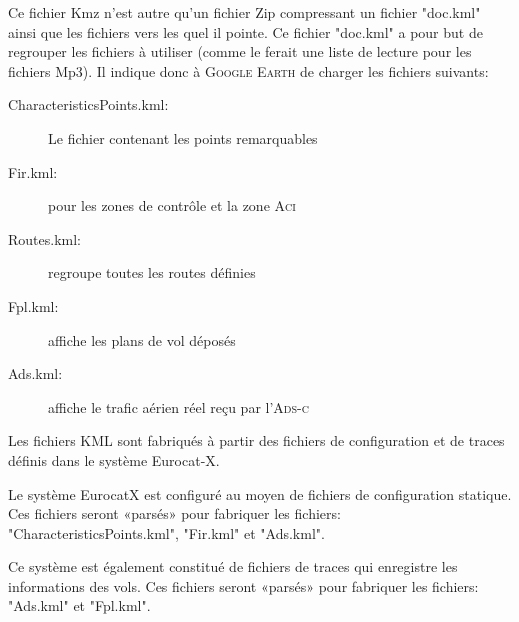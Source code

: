 Ce fichier Kmz n'est autre qu'un fichier Zip compressant un fichier "doc.kml" ainsi que les fichiers vers les quel il pointe. Ce fichier "doc.kml" a pour but de regrouper les fichiers à utiliser (comme le ferait une liste de lecture pour les fichiers Mp3). Il indique donc à \textsc{Google Earth} de charger les fichiers suivants:
\begin{description}
\item[CharacteristicsPoints.kml:] Le fichier contenant les points remarquables
\item[Fir.kml:] pour les zones de contrôle et la zone \textsc{Aci} 
\item[Routes.kml:] regroupe toutes les routes définies
\item[Fpl.kml:] affiche les plans de vol déposés
\item[Ads.kml:] affiche le trafic aérien réel reçu par l'\textsc{Ads-c}
\end{description}\medskip

Les fichiers KML sont fabriqués à partir des fichiers de configuration et de traces définis dans le système Eurocat-X. 

Le système EurocatX est configuré au moyen de fichiers de configuration statique. Ces fichiers seront «parsés» pour fabriquer les fichiers: "CharacteristicsPoints.kml", "Fir.kml" et "Ads.kml".

Ce système est également constitué de fichiers de traces qui enregistre les informations des vols. Ces fichiers seront «parsés» pour fabriquer les fichiers: "Ads.kml" et "Fpl.kml".

